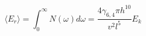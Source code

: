 \begin{equation}
\langle E_r \rangle = \int_0^{\infty} N(\omega) d\omega = \frac{4
\gamma_{6,4}
\pi h^{10}}{v^2 l^5} E_k
\end{equation}

